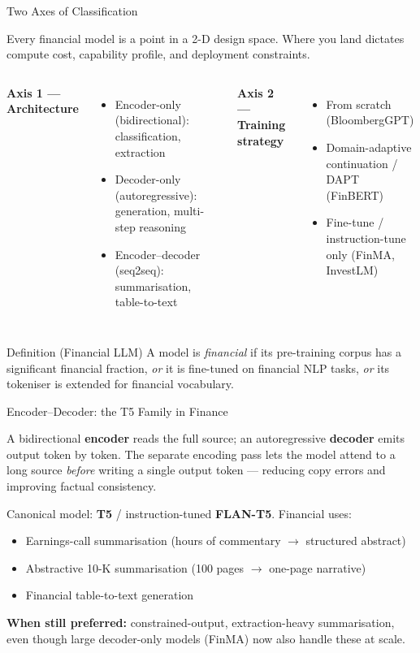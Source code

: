 \documentclass[9pt,t]{beamer}
\begin{document}
\begin{frame}{Two Axes of Classification}
\begin{bigpicture}
Every financial model is a point in a 2-D design space. Where you land dictates
compute cost, capability profile, and deployment constraints.
\end{bigpicture}

\medskip
\begin{columns}[T]
\textbf{Axis 1 --- Architecture}
\begin{itemize}
  \item Encoder-only (bidirectional): classification, extraction
  \item Decoder-only (autoregressive): generation, multi-step reasoning
  \item Encoder--decoder (seq2seq): summarisation, table-to-text
\end{itemize}
\textbf{Axis 2 --- Training strategy}
\begin{itemize}
  \item From scratch (BloombergGPT)
  \item Domain-adaptive continuation / DAPT (FinBERT)
  \item Fine-tune / instruction-tune only (FinMA, InvestLM)
\end{itemize}
\end{columns}

\medskip
\begin{block}{Definition (Financial LLM)}
A model is \emph{financial} if its pre-training corpus has a significant financial
fraction, \emph{or} it is fine-tuned on financial NLP tasks, \emph{or} its
tokeniser is extended for financial vocabulary.
\end{block}
\end{frame}

\begin{frame}{Encoder--Decoder: the T5 Family in Finance}
\begin{underhood}
A bidirectional \textbf{encoder} reads the full source; an autoregressive
\textbf{decoder} emits output token by token. The separate encoding pass lets the
model attend to a long source \emph{before} writing a single output token ---
reducing copy errors and improving factual consistency.
\end{underhood}

\medskip
Canonical model: \textbf{T5} / instruction-tuned \textbf{FLAN-T5}. Financial uses:
\begin{itemize}
  \item Earnings-call summarisation (hours of commentary $\to$ structured abstract)
  \item Abstractive 10-K summarisation (100 pages $\to$ one-page narrative)
  \item Financial table-to-text generation
\end{itemize}

\medskip
\textbf{When still preferred:} constrained-output, extraction-heavy summarisation,
even though large decoder-only models (FinMA) now also handle these at scale.
\end{frame}
\end{document}
